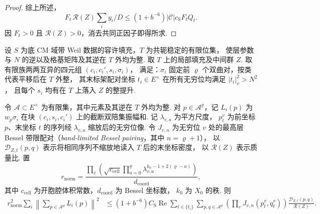 \begin{proof}
综上所述，
\[
 F_t\,\mathcal R(Z)\sum_i y_i/D
 \le (1+b^{-6})|\mathcal C|c_{\mathrm S}F_t Q_t .
\]
因 $F_t>0$ 且 $\mathcal R(Z)>0$，消去共同正因子即得所求.
\end{proof}

\begin{lemma}
\label{lem:b-siegel-modal-sum}
\emitthmsource
设 $S$ 为底 CM 域带 Weil 数据的容许填充，$T$ 为共轭稳定的有限位集，
使层参数与 $N$ 的逆以及格基矩阵及其逆在 $T$ 外均为整.
取 $T$ 上的局部填充及中间群 $Z$.
取有限族两两互异的四元组 $(c_i,c_i',s_i,\sigma_i)$，
满足：$\sigma_i$ 固定前 $\varrho$ 个双曲对，按类代表平移后在 $T$ 外整，
其末标架配对坐标 $t_i\in E^\times$ 在所有无穷位均满足 $|t_i|_v^2>N^2$，
且每个 $s_i$ 均有在 $T$ 上落入 $Z$ 的整提升.

令 $\mathcal A\subset E^\times$ 为有限集，其中元素及其逆在 $T$ 外均为整.
对 $p\in\mathcal A^\varrho$，记 $L_i(p)$ 为 $w_p\sigma_i$
在块 $(c_i,s_i,c_i')$ 上的截断双陪集振幅和. 记 $\lambda_{v,a}$ 为平方尺度，
$p^v_t$ 为前坐标 $p$、末坐标 $t$ 的序列经 $\lambda_{v,a}$ 缩放后的无穷位像.
令 $J_{v,n}$ 为无穷位 $v$ 处的最高层 Bessel 带限配对（\emph{band-limited Bessel pairing}，其中 $n=\varrho+1$），
以 $\mathcal D_{Z,t}(p,q)$ 表示将相同序列不缩放地读入 $T$ 后的末坐标密度，
以 $\mathcal R(Z)$ 表示质量比. 置
\[
 r_{\mathrm{norm}}=\frac{\displaystyle\prod_v\left(
     \sqrt{c_{\mathrm{cell}}}
      \prod_{a=0}^{\varrho}\lambda_{v,a}^{k_0-1+2(\varrho-a)}\right)}
                    {d_{\mathrm{coord}}},
\]
其中 $c_{\mathrm{cell}}$ 为开胞腔体积常数，$d_{\mathrm{coord}}$ 为 Bessel 坐标数，
$k_0$ 为 $X_0$ 的秩. 则
\[
 \begin{aligned}
 r_{\mathrm{norm}}^2\sum_i\left\|\sum_{p\in\mathcal A^\varrho}L_i(p)\right\|^2
 &\le (1+b^{-6})C_{\mathrm S}
       \operatorname{Re}\sum_{t\in\{t_i\}}
            \sum_{p,q\in\mathcal A^\varrho}
          \left(\prod_v J_{v,n}(p^v_t,q^v_t)\right)
             \frac{\mathcal D_{Z,t}(p,q)}{\mathcal R(Z)} .
 \end{aligned}
\]
\end{lemma}
